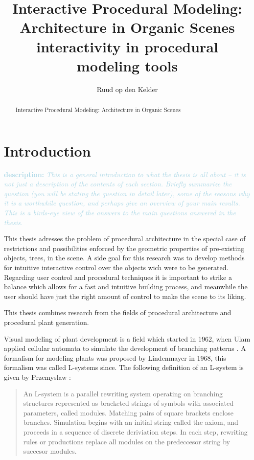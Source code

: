 \documentclass{article}
\title{Interactive Procedural Modeling: Architecture in Organic Scenes  \small{interactivity in procedural modeling tools}}
\author{Ruud op den Kelder}
\newcommand{\desc}[1]{\textcolor{lightblue}{\textbf{\newline description: }\it{#1} \newline}}
\begin{document}
\maketitle

\begin{abstract}
Interactive Procedural Modeling: Architecture in Organic Scenes 
\end{abstract}
\newpage 

\tableofcontents
\newpage 

\section{Introduction}

\desc{This is a general introduction to what the thesis is all about -- it is not just a description of the contents of each section. Briefly summarize the question (you will be stating the question in detail later), some of the reasons why it is a worthwhile question, and perhaps give an overview of your main results. This is a birds-eye view of the answers to the main questions answered in the thesis.}

This thesis adresses the problem of procedural architecture in the special case of restrictions and possibilities enforced by the geometric properties of pre-existing objects, trees, in the scene. A side goal for this research was to develop methods for intuitive interactive control over the objects wich were to be generated. Regarding user control and procedural techniques it is important to strike a balance which allows for a fast and intuitive building process, and meanwhile the user should have just the right amount of control to make the scene to its liking.

This thesis combines research from the fields of procedural architecture and procedural plant generation.

Visual modeling of plant development is a field which started in 1962, when Ulam applied cellular automata to 
simulate the development of branching patterns \cite{PrzemyslawPlants}. A formalism for modeling plants was proposed by Lindenmayer in 1968, this formalism was called L-systems since. The following definition of an L-system is given by Przemyslaw \cite{PrzemyslawPlants}: 

\begin{quote}
An L-system is a parallel rewriting system operating on branching structures represented as bracketed strings of symbols with associated parameters, called modules. Matching pairs of square brackets enclose branches. Simulation begins with an  initial string called the axiom, and proceeds in a sequence of discrete deriviation steps. In each step, rewriting rules or productions replace all modules on the predeccesor string by succesor modules.   
\end{quote}   
\end{document}
